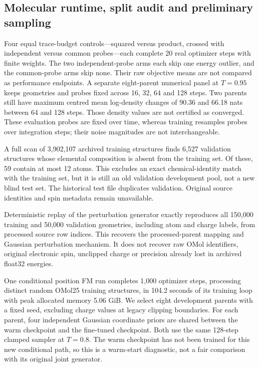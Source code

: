 \subsection{Molecular runtime, split audit and preliminary sampling}

Four equal trace-budget controls---squared versus product, crossed with independent versus
common probes---each complete 20 real optimizer steps with finite weights. The two
independent-probe arms each skip one energy outlier, and the common-probe arms skip none.
Their raw objective means are not compared as performance endpoints. A separate eight-parent
numerical panel at $T=0.95$ keeps geometries and probes fixed across 16, 32, 64 and 128 steps.
Two parents still have maximum centred mean log-density changes of 90.36 and 66.18 nats between
64 and 128 steps. Those density values are not certified as converged. These evaluation probes
are fixed over time, whereas training resamples probes over integration steps; their noise
magnitudes are not interchangeable.

A full scan of 3,902,107 archived training structures finds 6,527 validation structures whose
elemental composition is absent from the training set. Of these, 59 contain at most 12 atoms.
This excludes an exact chemical-identity match with the training set, but it is still an old
validation development pool, not a new blind test set. The historical test file duplicates
validation. Original source identities and spin metadata remain unavailable.

Deterministic replay of the perturbation generator exactly reproduces all 150,000 training
and 50,000 validation geometries, including atom and charge labels, from processed source
row indices. This recovers the processed-parent mapping and Gaussian perturbation mechanism.
It does not recover raw OMol identifiers, original electronic spin, unclipped charge or
precision already lost in archived float32 energies.

One conditional position FM run completes 1,000 optimizer steps, processing distinct random
OMol25 training structures, in 104.2 seconds of its training loop with peak allocated memory
5.06 GiB. We select eight development parents with a fixed seed, excluding charge values at
legacy clipping boundaries. For each parent, four independent Gaussian coordinate priors are
shared between the warm checkpoint and the fine-tuned checkpoint. Both use the same
128-step clamped sampler at $T=0.8$. The warm checkpoint has not been trained for this new
conditional path, so this is a warm-start diagnostic, not a fair comparison with its original
joint generator.

